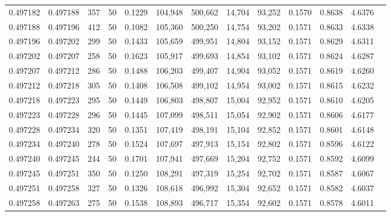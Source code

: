 \begin{tabular}{rrrrrrrrrrrrr}
0.497182 & 0.497188 & 357 &  50 &                                     0.1229 & 104,948 & 500,662 &  14,704 &  93,252 & 0.1570 & 0.8638 & 4.6376 \\
0.497188 & 0.497196 & 412 &  50 &                                     0.1082 & 105,360 & 500,250 &  14,754 &  93,202 & 0.1571 & 0.8633 & 4.6338 \\
0.497196 & 0.497202 & 299 &  50 &                                     0.1433 & 105,659 & 499,951 &  14,804 &  93,152 & 0.1571 & 0.8629 & 4.6311 \\
0.497202 & 0.497207 & 258 &  50 &                                     0.1623 & 105,917 & 499,693 &  14,854 &  93,102 & 0.1571 & 0.8624 & 4.6287 \\
0.497207 & 0.497212 & 286 &  50 &                                     0.1488 & 106,203 & 499,407 &  14,904 &  93,052 & 0.1571 & 0.8619 & 4.6260 \\
0.497212 & 0.497218 & 305 &  50 &                                     0.1408 & 106,508 & 499,102 &  14,954 &  93,002 & 0.1571 & 0.8615 & 4.6232 \\
0.497218 & 0.497223 & 295 &  50 &                                     0.1449 & 106,803 & 498,807 &  15,004 &  92,952 & 0.1571 & 0.8610 & 4.6205 \\
0.497223 & 0.497228 & 296 &  50 &                                     0.1445 & 107,099 & 498,511 &  15,054 &  92,902 & 0.1571 & 0.8606 & 4.6177 \\
0.497228 & 0.497234 & 320 &  50 &                                     0.1351 & 107,419 & 498,191 &  15,104 &  92,852 & 0.1571 & 0.8601 & 4.6148 \\
0.497234 & 0.497240 & 278 &  50 &                                     0.1524 & 107,697 & 497,913 &  15,154 &  92,802 & 0.1571 & 0.8596 & 4.6122 \\
0.497240 & 0.497245 & 244 &  50 &                                     0.1701 & 107,941 & 497,669 &  15,204 &  92,752 & 0.1571 & 0.8592 & 4.6099 \\
0.497245 & 0.497251 & 350 &  50 &                                     0.1250 & 108,291 & 497,319 &  15,254 &  92,702 & 0.1571 & 0.8587 & 4.6067 \\
0.497251 & 0.497258 & 327 &  50 &                                     0.1326 & 108,618 & 496,992 &  15,304 &  92,652 & 0.1571 & 0.8582 & 4.6037 \\
0.497258 & 0.497263 & 275 &  50 &                                     0.1538 & 108,893 & 496,717 &  15,354 &  92,602 & 0.1571 & 0.8578 & 4.6011 \\

\end{tabular}
